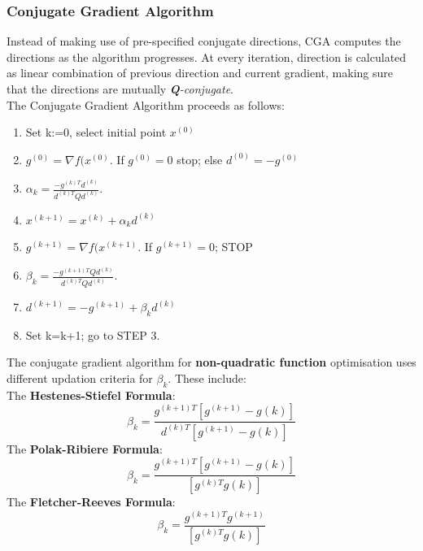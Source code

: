 \documentclass[12pt,a4paper,titlepage]{article}
\begin{document}
\subsubsection{Conjugate Gradient Algorithm}
Instead of making use of pre-specified conjugate directions, CGA computes the directions as the algorithm progresses. At every iteration, direction is calculated as linear combination of previous direction and current gradient, making sure that the directions are mutually \textit{\textbf{Q}-conjugate}.\\The Conjugate Gradient Algorithm proceeds as follows: 
\begin{enumerate}
    \item Set k:=0, select initial point $x^{(0)}$
    \item $g^{(0)}= \nabla f(x^{(0)}. $ If $g^{(0)} = 0$ stop; else $d^{(0)}= -g^{(0)}$
    \item $\alpha_{k}= \frac{-g^{(k)T}d^{(k)}}{d^{(k)T}Qd^{(k)}}.$
    \item $x^{(k+1)}  = x^{(k)}+ \alpha_{k}d^{(k)}$
    \item $g^{(k+1)}= \nabla f(x^{(k+1)}.$ If $g^{(k+1)}=0$; STOP
    \item $\beta_{k}= \frac{-g^{(k+1)T}Qd^{(k)}}{d^{(k)T}Qd^{(k)}}.$
    \item $d^{(k+1)}= -g^{(k+1)}+\beta_{k}d^{(k)} $
    \item Set k=k+1; go to STEP 3.
\end{enumerate}
The conjugate gradient algorithm for \textbf{non-quadratic function} optimisation uses different updation criteria for $\beta_{k}$. These include:
\\ The \textbf{Hestenes-Stiefel Formula}:
\begin{equation}
    \beta_{k}= \frac{g^{(k+1)T}[g^{(k+1)}-g{(k)}]}{d^{(k)T}[g^{(k+1)}-g{(k)}]}
\end{equation}
The \textbf{Polak-Ribiere Formula}:
\begin{equation}
    \beta_{k}= \frac{g^{(k+1)T}[g^{(k+1)}-g{(k)}]}{[g^{(k)T}g{(k)}]}
\end{equation}
The \textbf{Fletcher-Reeves Formula}:
\begin{equation}
        \beta_{k}= \frac{g^{(k+1)T}g^{(k+1)}}{[g^{(k)T}g{(k)}]}
\end{equation}
\end{document}
